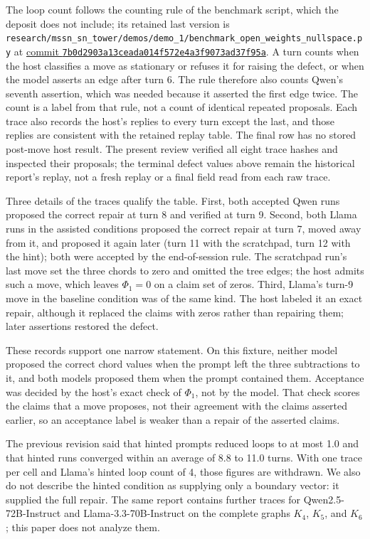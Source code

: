 \documentclass[
  11pt,
]{article}
\begin{document}
The loop count follows the counting rule of the benchmark script, which
the deposit does not include; its retained last version is
\nolinkurl{research/mssn_sn_tower/demos/demo_1/benchmark_open_weights_nullspace.py}
at
\href{https://github.com/dbccpage/the_symbol_game/blob/7b0d2903a13ceada014f572e4a3f9073ad37f95a/research/mssn_sn_tower/demos/demo_1/benchmark_open_weights_nullspace.py}{commit
\nolinkurl{7b0d2903a13ceada014f572e4a3f9073ad37f95a}}. A turn counts
when the host classifies a move as stationary or refuses it for raising
the defect, or when the model asserts an edge after turn 6. The rule
therefore also counts Qwen's seventh assertion, which was needed because
it asserted the first edge twice. The count is a label from that rule,
not a count of identical repeated proposals. Each trace also records the
host's replies to every turn except the last, and those replies are
consistent with the retained replay table. The final row has no stored
post-move host result. The present review verified all eight trace
hashes and inspected their proposals; the terminal defect values above
remain the historical report's replay, not a fresh replay or a final
field read from each raw trace.

Three details of the traces qualify the table. First, both accepted Qwen
runs proposed the correct repair at turn 8 and verified at turn 9.
Second, both Llama runs in the assisted conditions proposed the correct
repair at turn 7, moved away from it, and proposed it again later (turn
11 with the scratchpad, turn 12 with the hint); both were accepted by
the end-of-session rule. The scratchpad run's last move set the three
chords to zero and omitted the tree edges; the host admits such a move,
which leaves \(\Phi_1=0\) on a claim set of zeros. Third, Llama's turn-9
move in the baseline condition was of the same kind. The host labeled it
an exact repair, although it replaced the claims with zeros rather than
repairing them; later assertions restored the defect.

These records support one narrow statement. On this fixture, neither
model proposed the correct chord values when the prompt left the three
subtractions to it, and both models proposed them when the prompt
contained them. Acceptance was decided by the host's exact check of
\(\Phi_1\), not by the model. That check scores the claims that a move
proposes, not their agreement with the claims asserted earlier, so an
acceptance label is weaker than a repair of the asserted claims.

The previous revision said that hinted prompts reduced loops to at most
1.0 and that hinted runs converged within an average of 8.8 to 11.0
turns. With one trace per cell and Llama's hinted loop count of 4, those
figures are withdrawn. We also do not describe the hinted condition as
supplying only a boundary vector: it supplied the full repair. The same
report contains further traces for Qwen2.5-72B-Instruct and
Llama-3.3-70B-Instruct on the complete graphs \(K_4\), \(K_5\), and
\(K_6\); this paper does not analyze them.
\end{document}
